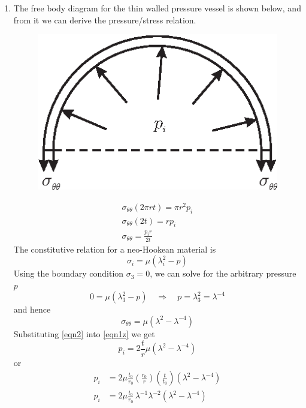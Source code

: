 \documentclass[11pt]{article}
\begin{document}
\begin{enumerate}
\item The  free body diagram for the thin walled pressure vessel
is shown below, and from it we can derive the pressure/stress
relation.
\begin{figure}[h]
\centering
\includegraphics{balloon_soln_c.eps}
\end{figure}
\begin{gather}
\sigma_{\theta\theta} (2\pi r t) = \pi r^2 p_i \nonumber\\
\sigma_{\theta\theta} (2 t) =  r p_i \nonumber\\
\sigma_{\theta\theta} = \frac{ p_i r}{2t} \label{eqn1z}
\end{gather}
The constitutive relation for a neo-Hookean material is
\begin{equation*}
\sigma_i = \mu(\lambda_i^2 - p)
\end{equation*}
Using the boundary condition $\sigma_3 = 0$, we can solve for the
arbitrary pressure $p$
\begin{equation*}
0 = \mu(\lambda_3^2 - p) \quad \Longrightarrow \quad p = \lambda_3^2
= \lambda^{-4}
\end{equation*}
and hence
\begin{equation}
\sigma_{\theta\theta} = \mu(\lambda^2 - \lambda^{-4}) \label{eqn2}
\end{equation}
Substituting \eqref{eqn2} into \eqref{eqn1z} we get
\begin{equation}
p_i = 2 \frac{t}{r}\mu(\lambda^2 - \lambda^{-4})
\end{equation}
or
\begin{align}
p_i &= 2\mu  \frac{t_0}{r_0} \left( \frac{r_0}{r} \right)
\left(\frac{t}{t_0}\right)(\lambda^2 -
\lambda^{-4}) \nonumber\\
p_i &= 2\mu  \frac{t_0}{r_0}\,\lambda^{-1} \lambda^{-2} (\lambda^2
- \lambda^{-4}) \nonumber\\

\end{align}
\end{enumerate}
\end{document}
